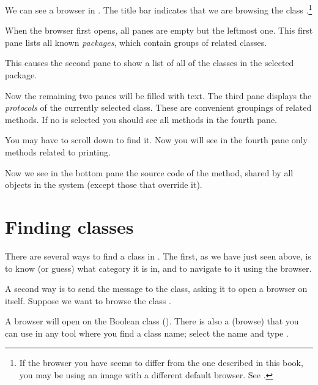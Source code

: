 \documentclass[a4paper,10pt,twoside]{book}
\begin{document}
We can see a browser in .
The title bar indicates that we are browsing the class .\footnote{If the browser you have seems to differ from the one described in this book, you may be using an image with a different default browser. See .}

When the browser first opens, all panes are empty but the leftmost one.
This first pane lists all known \emph{packages}, which contain groups of related classes.

This causes the second pane to show a list of all of the classes in the selected package.

Now the remaining two panes will be filled with text.
The third pane displays the \emph{protocols} of the currently selected class.
These are convenient groupings of related methods.
If no  is selected you should see all methods in the fourth pane.


You may have to scroll down to find it.
Now you will see in the fourth pane only methods related to printing.

Now we see in the bottom pane the source code of the  method, shared by all objects in the system (except those that override it).

\section{Finding classes}

There are several ways to find a class in \pharo.  The first, as we have just seen above, is to know (or guess) what category it is in, and to navigate to it using the browser.

A second way is to send the  message to the class, asking it to open a browser on itself.  Suppose we want to browse the class .

A browser will open on the Boolean class ().
There is also a   (browse) that you can use in any tool where you find a class name;
select the name and type .
\end{document}
